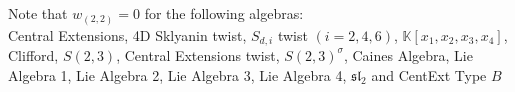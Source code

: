 \documentclass{amsart}
\begin{document}

\begin{remark}
Note that \(w_{(2,2)} = 0\) for the following algebras: \\
Central Extensions, 4D Sklyanin twist, $S_{d,i}$ twist $(i=2,4,6)$, $\mathbb{K}[x_1,x_2,x_3,x_4]$, Clifford,  $S(2,3)$, Central Extensions twist, $S(2,3)^{\sigma}$, Caines Algebra, Lie Algebra 1, Lie Algebra 2, Lie Algebra 3, Lie Algebra 4, $\mathfrak{sl_2}$ and CentExt Type $B$
\end{remark}
\end{document}

